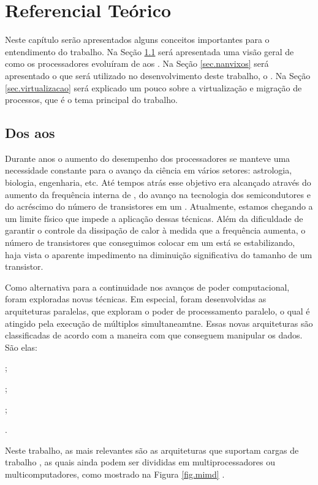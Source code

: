\glsresetall
\chapter{Referencial Teórico}
\label{chap.background}

Neste capítulo serão apresentados alguns conceitos importantes para o entendimento do trabalho. Na Seção \ref{sec.lw} será apresentada uma visão geral de como os processadores evoluíram de \singlecores aos \lws. Na Seção \ref{sec.nanvixos} será apresentado o \so que será utilizado no desenvolvimento deste trabalho, o \nanvix. Na Seção \ref{sec.virtualizacao} será explicado um pouco sobre a virtualização e migração de processos, que é o tema principal do trabalho.

\section{Dos \singlecores aos \Lws}
\label{sec.lw}

Durante anos o aumento do desempenho dos processadores se manteve uma necessidade constante para o avanço da ciência em vários setores: astrologia, biologia, engenharia, etc. Até tempos atrás esse objetivo era alcançado através do aumento da frequência interna de \singlecores, do avanço na tecnologia dos semicondutores e do acréscimo do número de transistores em um \chip. Atualmente, estamos chegando a um limite físico que impede a aplicação dessas técnicas. Além da dificuldade de garantir o controle da dissipação de calor à medida que a frequência aumenta, o número de transistores que conseguimos colocar em um \chip está se estabilizando, haja vista o aparente impedimento na diminuição significativa do tamanho de um transistor.

Como alternativa para a continuidade nos avanços de poder computacional, foram exploradas novas técnicas. Em especial, foram desenvolvidas as arquiteturas paralelas, que exploram o poder de processamento paralelo, o qual é atingido pela execução de múltiplos \cores simultaneamtne. Essas novas arquiteturas são classificadas de acordo com a maneira com que conseguem manipular os dados. São elas:
\begin{inlinelist}
    \item \sisd;
    \item \simd;
    \item \misd;
    \item \mimd.
\end{inlinelist}
Neste trabalho, as mais relevantes são as arquiteturas que suportam cargas de trabalho \mimd, as quais ainda podem ser divididas em multiprocessadores ou multicomputadores, como mostrado na Figura \ref{fig.mimd} \cite{tanenbaum:4ed}. 

